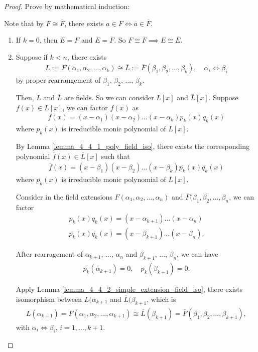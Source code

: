 \documentclass[utf8]{ctexbook}
\theoremstyle{definition}
\begin{document}
\begin{proof}
Prove by mathematical induction:

Note that by $F \cong \overline{F}$, there exists $a \in F \iff \overline{a} \in \overline{F}$.

\begin{enumerate}
\item{If $k=0$, then $E = F$ and $\overline{E} = \overline{F}$. So $F \cong \overline{F} \implies E \cong \overline{E}$.}
\item{Suppose if $k < n$, there exists
\begin{align*}
L := F(\alpha_1, \alpha_2, \ldots, \alpha_k) \cong \overline{L} := \overline{F}(\beta_1, \beta_2, \ldots, \beta_k) , \quad \alpha_i \iff \beta_i 
\end{align*}
by proper rearrangement of $\beta_1$, $\beta_2$, $\ldots$, $\beta_k$.

Then, $L$ and $\overline{L}$ are fields. So we can consider $L[x]$ and $\overline{L}[x]$. Suppose $f(x) \in L[x]$, we can factor $f(x)$ as
\begin{align*}
f(x) = (x- \alpha_1) (x - \alpha_2) \ldots (x - \alpha_k) p_k (x) q_k (x)
\end{align*}
where $p_k (x)$ is irreducible monic polynomial of $L[x]$.

By Lemma \ref{lemma_4_4_1_poly_field_iso}, there exists the corresponding polynomial $\overline{f} (x) \in \overline{L}[x]$ such that
\begin{align*}
\overline{f}(x) = (x - \beta_1) (x - \beta_2) \ldots (x - \beta_k) \overline{p_k} (x) \overline{q_k} (x)
\end{align*}
where $\overline{p_k} (x)$ is irreducible monic polynomial of $\overline{L}[x]$.

Consider in the field extensions $F(\alpha_1, \alpha_2, \ldots , \alpha_n)$ and $\overline{F}(\beta_1, \beta_2, \ldots , \beta_n$, we can factor
\begin{align*}
p_k(x) q_k(x) = (x- \alpha_{k+1}) \ldots (x - \alpha_{n} ) \\
\overline{p_k} (x) \overline{q_k} (x) = (x - \beta_{k+1} ) \ldots (x - \beta_{n}) .
\end{align*}

After rearragement of $\alpha_{k+1}$, $\ldots$, $\alpha_{n}$ and $\beta_{k+1}$, $\ldots$, $\beta_{n}$, we can have
\begin{align*}
p_k (\alpha_{k+1} ) = 0, \quad \overline{p_k} (\beta_{k+1} ) = 0.
\end{align*}

Apply Lemma \ref{lemma_4_4_2_simple_extension_field_iso}, there exists isomorphism between $L(\alpha_{k+1}$ and $\overline{L}(\beta_{k+1}$, which is
\begin{align*}
L(\alpha_{k+1}) = F(\alpha_1, \alpha_2, \ldots, \alpha_{k+1}) \cong \overline{L} (\beta_{k+1}) = \overline{F}(\beta_1, \beta_2, \ldots, \beta_{k+1}),
\end{align*}
with $\alpha_i \iff \beta_i$, $i = 1, \ldots, k+1$.
}
\end{enumerate}

\end{proof}
\end{document}
